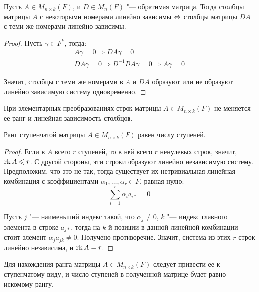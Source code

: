 \begin{proposition}
	Пусть $A \in M_{n \times k}(F)$, и $D \in M_{n}(F)$ "--- обратимая матрица. Тогда столбцы матрицы $A$ с некоторыми номерами линейно зависимы $\Leftrightarrow$ столбцы матрицы $DA$ с теми же номерами линейно зависимы.
\end{proposition}

\begin{proof}
	Пусть $\gamma \in F^k$, тогда:
	\begin{gather*}
		A\gamma = 0 \Rightarrow DA\gamma = 0\\
		DA\gamma = 0 \Rightarrow D^{-1}DA\gamma = 0 \Rightarrow A\gamma = 0
	\end{gather*}
	
	Значит, столбцы с теми же номерами в $A$ и $DA$ образуют или не образуют линейно зависимую систему одновременно.
\end{proof}

\begin{corollary}
	При элементарных преобразованиях строк матрицы $A \in M_{n \times k}(F)$ не меняется ее ранг и линейная зависимость столбцов.
\end{corollary}

\begin{proposition}
	Ранг ступенчатой матрицы $A \in M_{n \times k}(F)$ равен числу ступеней.
\end{proposition}

\begin{proof}
	Если в $A$ всего $r$ ступеней, то в ней всего $r$ ненулевых строк, значит, $\operatorname{rk}{A} \leqslant r$. С другой стороны, эти строки образуют линейно независимую систему. Предположим, что это не так, тогда существует их нетривиальная линейная комбинация с коэффициентами $\alpha_1, \dots, \alpha_r \in F$, равная нулю:
	\[\sum_{i = 1}^{r}\alpha_ia_{i*} = 0\]
	
	Пусть $j$ "--- наименьший индекс такой, что $\alpha_j \ne 0$, $k$ "--- индекс главного элемента в строке $a_{j*}$, тогда на $k$-й позиции в данной линейной комбинации стоит элемент $\alpha_j a_{jk} \ne 0$. Получено противоречие. Значит, система из этих $r$ строк линейно независима, и $\operatorname{rk}{A} = r$.
\end{proof}

\begin{corollary}
	Для нахождения ранга матрицы $A \in M_{n \times k}(F)$ следует привести ее к ступенчатому виду, и число ступеней в полученной матрице будет равно искомому рангу.
\end{corollary}

